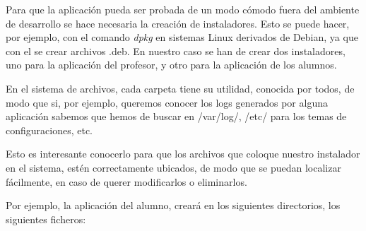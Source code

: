 Para que la aplicación pueda ser probada de un modo cómodo fuera del ambiente de desarrollo se hace necesaria la creación de instaladores. Esto se puede hacer, por ejemplo, con el comando \emph{dpkg} en sistemas Linux derivados de Debian, ya que con el se crear archivos .deb. En nuestro caso se han de crear dos instaladores, uno para la aplicación del profesor, y otro para la aplicación de los alumnos.
\newline

En el sistema de archivos, cada carpeta tiene su utilidad, conocida por todos, de modo que si, por ejemplo, queremos conocer los logs generados por alguna aplicación sabemos que hemos de buscar en /var/log/, /etc/ para los temas de configuraciones, etc.
\newline

Esto es interesante conocerlo para que los archivos que coloque nuestro instalador en el sistema, estén correctamente ubicados, de modo que se puedan localizar fácilmente, en caso de querer modificarlos o eliminarlos.
\newline


Por ejemplo, la aplicación del alumno, creará en los siguientes directorios, los siguientes ficheros:

